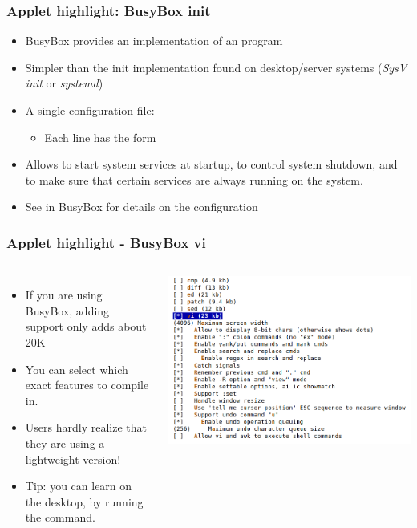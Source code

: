 \begin{frame}
  \frametitle{Applet highlight: BusyBox init}
  \begin{itemize}
  \item BusyBox provides an implementation of an  program
  \item Simpler than the init implementation found on desktop/server
    systems ({\em SysV init} or {\em systemd})
  \item A single configuration file: 
    \begin{itemize}
    \item Each line has the form 
    \end{itemize}
  \item Allows to start system services at startup, to control system
        shutdown, and to make sure that certain services are always
        running on the system.
  \item See  in BusyBox for details on the
    configuration
  \end{itemize}
\end{frame}

\begin{frame}
  \frametitle{Applet highlight - BusyBox vi}
  \begin{columns}
      \begin{itemize}
      \item If you are using BusyBox, adding  support only adds
        about 20K
      \item You can select which exact features to compile in.
      \item Users hardly realize that they are using a lightweight 
        version!
      \item Tip: you can learn  on the desktop, by running the 
        command.
      \end{itemize}
      \includegraphics[width=\textwidth]{slides/sysdev-busybox/busybox-vi-configuration.png}
  \end{columns}
\end{frame}

